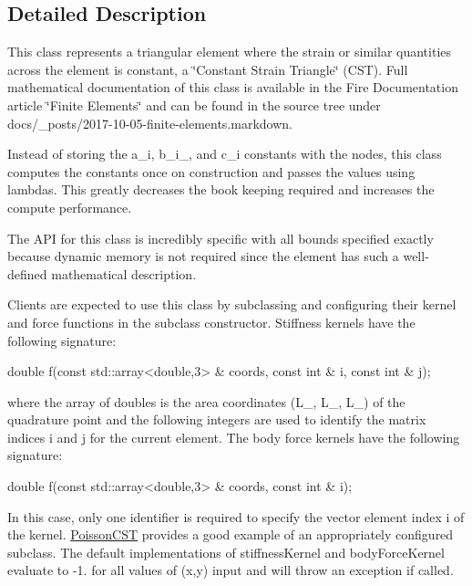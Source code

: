 \subsection{Detailed Description}
This class represents a triangular element where the strain or similar quantities across the element is constant, a \char`\"{}\+Constant Strain Triangle\char`\"{} (C\+ST). Full mathematical documentation of this class is available in the Fire Documentation article \char`\"{}\+Finite Elements\char`\"{} and can be found in the source tree under docs/\+\_\+posts/2017-\/10-\/05-\/finite-\/elements.\+markdown.

Instead of storing the a\+\_\+i, b\+\_\+i\+\_\+, and c\+\_\+i constants with the nodes, this class computes the constants once on construction and passes the values using lambdas. This greatly decreases the book keeping required and increases the compute performance.

The A\+PI for this class is incredibly specific with all bounds specified exactly because dynamic memory is not required since the element has such a well-\/defined mathematical description.

Clients are expected to use this class by subclassing and configuring their kernel and force functions in the subclass\textquotesingle{} constructor. Stiffness kernels have the following signature\+: 
\begin{DoxyCode}
\textcolor{keywordtype}{double} f(\textcolor{keyword}{const} std::array<double,3> & coords, \textcolor{keyword}{const} \textcolor{keywordtype}{int} & i,
\textcolor{keyword}{const} \textcolor{keywordtype}{int} & j);
\end{DoxyCode}
 where the array of doubles is the area coordinates (L\+\_, L\+\_, L\+\_) of the quadrature point and the following integers are used to identify the matrix indices i and j for the current element. The body force kernels have the following signature\+: 
\begin{DoxyCode}
\textcolor{keywordtype}{double} f(\textcolor{keyword}{const} std::array<double,3> & coords, \textcolor{keyword}{const} \textcolor{keywordtype}{int} & i);
\end{DoxyCode}
 In this case, only one identifier is required to specify the vector element index i of the kernel. \hyperlink{a00784}{Poisson\+C\+ST} provides a good example of an appropriately configured subclass. The default implementations of stiffness\+Kernel and body\+Force\+Kernel evaluate to -\/1. for all values of (x,y) input and will throw an exception if called.

